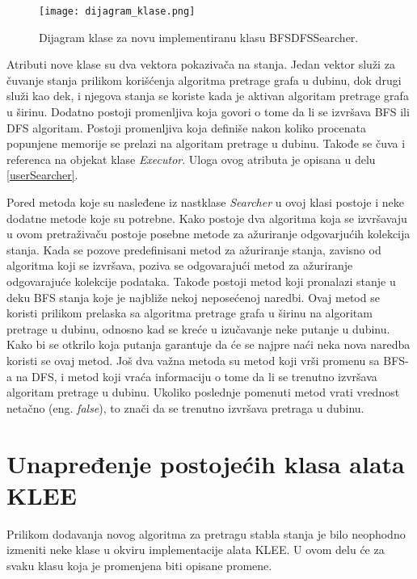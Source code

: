 \documentclass[12pt,oneside]{memoir}
\begin{document}
\begin{figure}[ht]
    \centering
    \texttt{[image: dijagram\_klase.png]}
    \caption{Dijagram klase za novu implementiranu klasu BFSDFSSearcher.}
    \label{fig:UML}
\end{figure}

Atributi nove klase su dva vektora pokazivača na stanja. Jedan vektor služi za čuvanje stanja prilikom korišćenja algoritma pretrage grafa u dubinu, dok drugi služi kao dek, i njegova stanja se koriste kada je aktivan algoritam pretrage grafa u širinu. Dodatno postoji promenljiva koja govori o tome da li se izvršava BFS ili DFS algoritam. Postoji promenljiva koja definiše nakon koliko procenata popunjene memorije se prelazi na algoritam pretrage u dubinu. Takođe se čuva i referenca na objekat klase \textit{Executor}. Uloga ovog atributa je opisana u delu \ref{userSearcher}.

Pored metoda koje su nasleđene iz nastklase \textit{Searcher} u ovoj klasi postoje i neke dodatne metode koje su potrebne. Kako postoje dva algoritma koja se izvršavaju u ovom pretraživaču postoje posebne metode za ažuriranje odgovarjućih kolekcija stanja. Kada se pozove predefinisani metod za ažuriranje stanja, zavisno od algoritma koji se izvršava, poziva se odgovarajući metod za ažuriranje odgovarajuće kolekcije podataka. Takođe postoji metod koji pronalazi stanje u deku BFS stanja koje je najbliže nekoj neposećenoj naredbi. Ovaj metod se koristi prilikom prelaska sa algoritma pretrage grafa u širinu na algoritam pretrage u dubinu, odnosno kad se kreće u izučavanje neke putanje u dubinu. Kako bi se otkrilo koja putanja garantuje da će se najpre naći neka nova naredba koristi se ovaj metod. Još dva važna metoda su metod koji vrši promenu sa BFS-a na DFS, i metod koji vraća informaciju o tome da li se trenutno izvršava algoritam pretrage u dubinu. Ukoliko poslednje pomenuti metod vrati vrednost netačno (eng. \textit{false}), to znači da se trenutno izvršava pretraga u dubinu.

\section{Unapređenje postojećih klasa alata KLEE} \label{izmene}
Prilikom dodavanja novog algoritma za pretragu stabla stanja je bilo neophodno izmeniti neke klase u okviru implementacije alata KLEE. U ovom delu će za svaku klasu koja je promenjena biti opisane promene.
\end{document}
